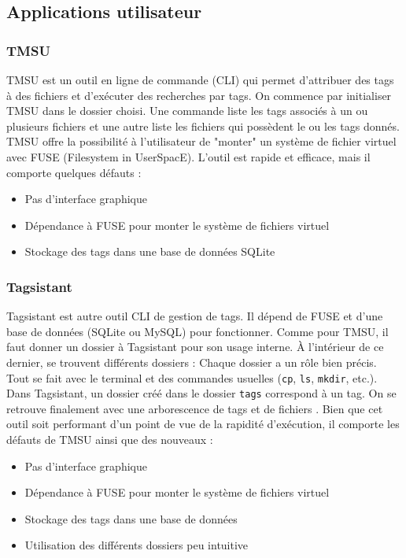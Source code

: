 \documentclass[a4paper, 12pt]{article}
\begin{document}
\subsection{Applications utilisateur}
\subsubsection{TMSU}
TMSU \cite{ref15} est un outil en ligne de commande (CLI) qui permet d'attribuer des tags à des 
fichiers et d'exécuter des recherches par tags. On commence par initialiser TMSU dans le dossier choisi. 
Une commande liste les tags associés à un ou 
plusieurs fichiers et une autre liste les fichiers qui possèdent le ou les tags donnés. TMSU offre 
la possibilité à l'utilisateur de "monter" un système de fichier virtuel avec FUSE (Filesystem in 
UserSpacE). L'outil est rapide et efficace, mais il comporte quelques défauts :
\begin{itemize}
    \item Pas d'interface graphique
    \item Dépendance à FUSE pour monter le système de fichiers virtuel
    \item Stockage des tags dans une base de données SQLite
\end{itemize}

\subsubsection{Tagsistant}
Tagsistant \cite{ref16} est autre outil CLI de gestion de tags. Il dépend de FUSE et d'une base 
de données (SQLite ou MySQL) pour fonctionner. Comme pour TMSU, il faut donner un dossier à Tagsistant 
pour son usage interne. À l'intérieur de ce dernier, se trouvent différents dossiers :
\bigbreak
Chaque dossier a un rôle bien précis. Tout se fait avec le terminal et des commandes usuelles 
(\texttt{cp}, \texttt{ls}, \texttt{mkdir}, etc.). Dans Tagsistant, 
un dossier créé dans le dossier \texttt{tags} correspond à un tag. On se retrouve 
finalement avec une arborescence de tags et de fichiers \cite{ref17}. Bien que cet outil soit 
performant d'un point de vue de la rapidité d'exécution, il comporte les défauts de TMSU ainsi que 
des nouveaux :
\begin{itemize}
    \item Pas d'interface graphique
    \item Dépendance à FUSE pour monter le système de fichiers virtuel
    \item Stockage des tags dans une base de données
    \item Utilisation des différents dossiers peu intuitive
\end{itemize} 
\end{document}
